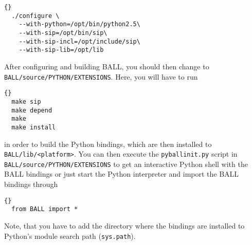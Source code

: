 \begin{lstlisting}{}
  ./configure \
    --with-python=/opt/bin/python2.5\
    --with-sip=/opt/bin/sip\
    --with-sip-incl=/opt/include/sip\
    --with-sip-lib=/opt/lib
\end{lstlisting}

\noindent
After configuring and building BALL, you should then change to {\tt
BALL/source/PYTHON/EXTENSIONS}. Here, you will have to run

\begin{lstlisting}{}
  make sip
  make depend
  make
  make install
\end{lstlisting}

\noindent
in order to build the Python bindings, which are then installed to
{\tt BALL/lib/<platform>}. You can then execute the {\tt pyballinit.py} script in 
{\tt BALL/source/PYTHON/EXTENSIONS} to get an interactive Python shell with
the BALL bindings or just start the Python interpreter and import the BALL
bindings through

\begin{lstlisting}{}
  from BALL import *
\end{lstlisting}

\noindent
Note, that you have to add the directory where the bindings are installed to
Python's module search path ({\tt sys.path}).

